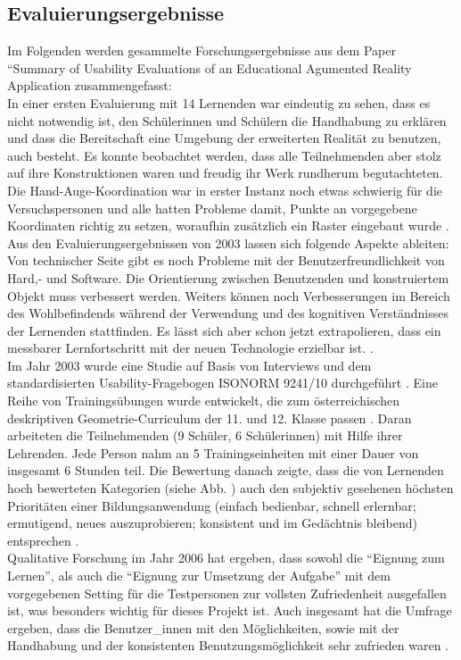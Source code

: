 \documentclass[deutsch]{llncs}
\begin{document}
\subsection{Evaluierungsergebnisse}
Im Folgenden werden gesammelte Forschungsergebnisse aus dem Paper ``Summary of Usability Evaluations of an Educational Agumented Reality Application zusammengefasst: \\
In einer ersten Evaluierung mit 14 Lernenden war eindeutig zu sehen, dass es nicht notwendig ist, den Schülerinnen und Schülern die Handhabung zu erklären und dass die Bereitschaft eine Umgebung der erweiterten Realität zu benutzen, auch besteht. Es konnte beobachtet werden, dass alle Teilnehmenden aber stolz auf ihre Konstruktionen waren und freudig ihr Werk rundherum begutachteten. Die Hand-Auge-Koordination war in erster Instanz noch etwas schwierig für die Versuchspersonen und alle hatten Probleme damit, Punkte an vorgegebene Koordinaten richtig zu setzen, woraufhin zusätzlich ein Raster eingebaut wurde \cite{Kaufmann:2002:MGE:1242073.1242086}.
Aus den Evaluierungsergebnissen von 2003 lassen sich folgende Aspekte ableiten: \\
Von technischer Seite gibt es noch Probleme mit der Benutzerfreundlichkeit von Hard,- und Software. Die Orientierung zwischen Benutzenden und konstruiertem Objekt muss verbessert werden. Weiters können noch Verbesserungen im Bereich des Wohlbefindends während der Verwendung und des kognitiven Verständnisses der Lernenden stattfinden.  Es lässt sich aber schon jetzt extrapolieren, dass ein messbarer Lernfortschritt mit der neuen Technologie erzielbar ist. \cite{article}. \\
Im Jahr 2003 wurde eine Studie auf Basis von Interviews und dem standardisierten Usability-Fragebogen ISONORM 9241/10 durchgeführt \cite{Kaufmann_summaryof}. Eine Reihe von Trainingsübungen wurde entwickelt, die zum österreichischen deskriptiven Geometrie-Curriculum der 11. und 12. Klasse passen \cite{Kaufmann_summaryof}.  Daran arbeiteten die Teilnehmenden (9 Schüler, 6 Schülerinnen) mit Hilfe ihrer Lehrenden. Jede Person nahm an 5 Trainingseinheiten mit einer Dauer von insgesamt 6 Stunden teil. Die Bewertung danach zeigte, dass die von Lernenden hoch bewerteten Kategorien (siehe Abb. \label{stat1}) auch den subjektiv gesehenen höchsten Prioritäten einer Bildungsanwendung (einfach bedienbar, schnell erlernbar; ermutigend, neues auszuprobieren; konsistent und im Gedächtnis bleibend) entsprechen \cite{Kaufmann_summaryof}.\\
Qualitative Forschung im Jahr 2006 hat ergeben, dass sowohl die ``Eignung zum Lernen'', als auch die ``Eignung zur Umsetzung der Aufgabe'' mit dem vorgegebenen Setting für die Testpersonen zur vollsten Zufriedenheit ausgefallen ist, was besonders wichtig für dieses Projekt ist. Auch insgesamt hat die Umfrage ergeben, dass die Benutzer\_innen mit den Möglichkeiten, sowie mit der Handhabung und der konsistenten Benutzungsmöglichkeit sehr zufrieden waren \cite{1667626}.
\end{document}
